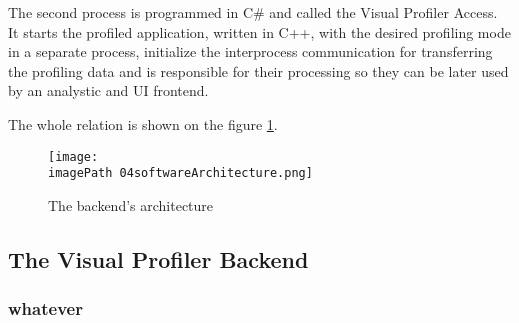 The second process is programmed in C\# and called the Visual Profiler Access. It starts the profiled application, written in C++, with the desired profiling mode in a separate process, initialize the interprocess communication for transferring the profiling data and is responsible for their processing so they can be later used by an analystic and UI frontend.

The whole relation is shown on the figure \ref{fig:04softwareArchitecture}.

\begin{figure}
	\centering
		\texttt{[image: \\imagePath 04softwareArchitecture.png]}
		\caption{The backend's architecture}
	\label{fig:04softwareArchitecture}
\end{figure}


\subsection{The Visual Profiler Backend }

\subsubsection{whatever}



